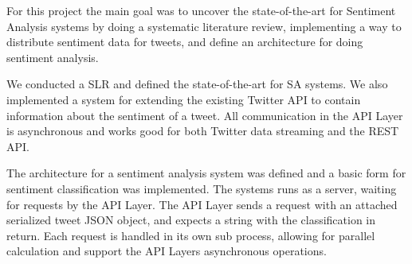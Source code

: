 For this project the main goal was to uncover the state-of-the-art for Sentiment Analysis systems by doing a systematic literature review, implementing a way to distribute sentiment data for tweets, and define an architecture for doing sentiment analysis. 

We conducted a SLR and defined the state-of-the-art for SA systems. We also implemented a system for extending the existing Twitter API to contain information about the sentiment of a tweet. All communication in the API Layer is asynchronous and works good for both Twitter data streaming and the REST API. 

The architecture for a sentiment analysis system was defined and a basic form for sentiment classification was implemented. The systems runs as a server, waiting for requests by the API Layer. The API Layer sends a request with an attached serialized tweet JSON object, and expects a string with the classification in return. Each request is handled in its own sub process, allowing for parallel calculation and support the API Layers asynchronous operations. 